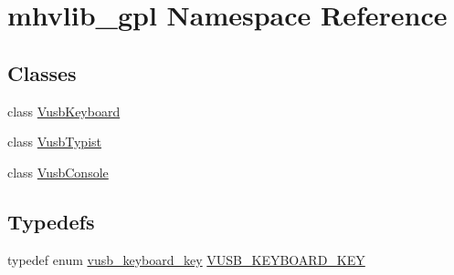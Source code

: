 \hypertarget{namespacemhvlib__gpl}{\section{mhvlib\-\_\-gpl Namespace Reference}
\label{namespacemhvlib__gpl}
}
\subsection*{Classes}
\begin{DoxyCompactItemize}
\item 
class \hyperlink{classmhvlib__gpl_1_1_vusb_keyboard}{Vusb\-Keyboard}
\item 
class \hyperlink{classmhvlib__gpl_1_1_vusb_typist}{Vusb\-Typist}
\item 
class \hyperlink{classmhvlib__gpl_1_1_vusb_console}{Vusb\-Console}
\end{DoxyCompactItemize}
\subsection*{Typedefs}
\begin{DoxyCompactItemize}
\item 
typedef enum \hyperlink{namespacemhvlib__gpl_aedc418598d33ab788795edf3a68244ad}{vusb\-\_\-keyboard\-\_\-key} \hyperlink{namespacemhvlib__gpl_aa9b4ef45d3803d8e5cd3ab8c7441e74f}{V\-U\-S\-B\-\_\-\-K\-E\-Y\-B\-O\-A\-R\-D\-\_\-\-K\-E\-Y}
\end{DoxyCompactItemize}
